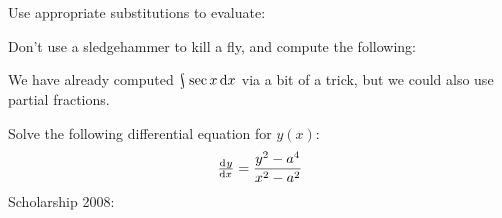 \begin{questions}
  \questioS Use appropriate substitutions to evaluate:
  \clearpage
  \questioE Don't use a sledgehammer to kill a fly, and compute the following:
  \questioO We have already computed $ \rint \sec x \dif{x} $ via a bit of a trick, but we could also use partial fractions.
  \questioS Solve the following differential equation for $ y(x) $:
    \begin{displaymath}
      \od{y}{x} = \frac{y^2 - a^4}{x^2 - a^2}
    \end{displaymath}
  \questioS Scholarship 2008:
    \begin{parts}

\end{parts}
\end{questions}
